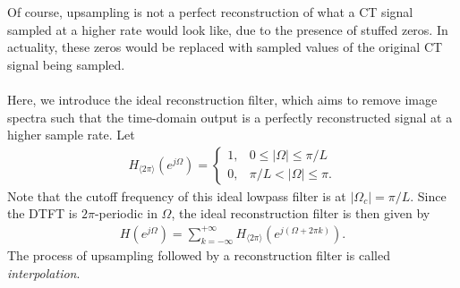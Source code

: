 \documentclass{report}
\begin{document}
Of course, upsampling is not a perfect reconstruction of what a CT signal sampled at a higher rate would look like, due to the presence of stuffed zeros. In actuality, these zeros would be replaced with 
sampled values of the original CT signal being sampled. 
\\ \\
Here, we introduce the ideal reconstruction filter, which aims to remove image spectra such that the time-domain output is a perfectly reconstructed signal at a higher sample rate. Let 
\begin{align}
    H_{\langle 2\pi\rangle}(e^{j\Omega}) = 
    \begin{cases}
        1, & 0\leq|\Omega|\leq\pi/L \\
        0, & \pi/L<|\Omega|\leq\pi.
    \end{cases}
\end{align}
Note that the cutoff frequency of this ideal lowpass filter is at $|\Omega_c|=\pi/L$. Since the DTFT is $2\pi$-periodic in $\Omega$, the ideal reconstruction filter is then given by 
\begin{align}
    H(e^{j\Omega}) = \sum_{k=-\infty}^{+\infty} H_{\langle 2\pi\rangle}(e^{j(\Omega+2\pi k)}).
\end{align}
The process of upsampling followed by a reconstruction filter is called \emph{interpolation}.
\begin{center}
\end{center}
\end{document}
